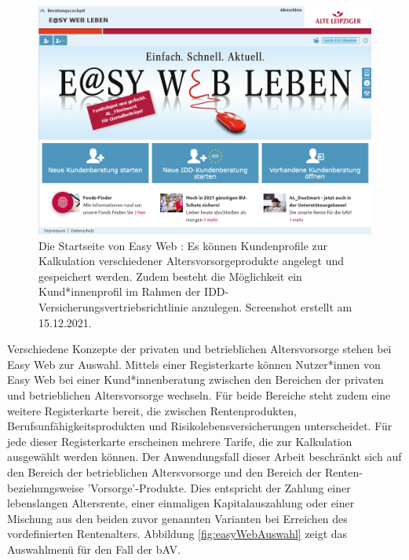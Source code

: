 \begin{figure}[!htb]
\centering
\includegraphics[width=0.8\columnwidth]{images/Easy_Web_Leben_allgemein.png}
\caption{Die Startseite von Easy Web \cite{easy_web}: Es können Kundenprofile zur Kalkulation verschiedener Altersvorsorgeprodukte angelegt und gespeichert werden. Zudem besteht die Möglichkeit ein Kund*innenprofil im Rahmen der IDD-Versicherungsvertriebsrichtlinie anzulegen. Screenshot erstellt am 15.12.2021.}
\label{fig:easyWeballg}
\end{figure}

Verschiedene Konzepte der privaten und betrieblichen Altersvorsorge stehen bei Easy Web zur Auswahl. Mittels einer Registerkarte können Nutzer*innen von Easy Web bei einer Kund*innenberatung zwischen den Bereichen der privaten und betrieblichen Altersvorsorge wechseln. Für beide Bereiche steht zudem eine weitere Registerkarte bereit, die zwischen Rentenprodukten, Berufsunfähigkeitsprodukten und Risikolebensversicherungen unterscheidet. Für jede dieser Registerkarte erscheinen mehrere Tarife, die zur Kalkulation ausgewählt werden können. Der Anwendungsfall dieser Arbeit beschränkt sich auf den Bereich der betrieblichen Altersvorsorge und den Bereich der Renten- beziehungsweise 'Vorsorge'-Produkte. Dies entspricht der Zahlung einer lebenslangen Altersrente, einer einmaligen Kapitalauszahlung oder einer Mischung aus den beiden zuvor genannten Varianten bei Erreichen des vordefinierten Rentenalters. Abbildung \ref{fig:easyWebAuswahl} zeigt das Auswahlmenü für den Fall der bAV.

